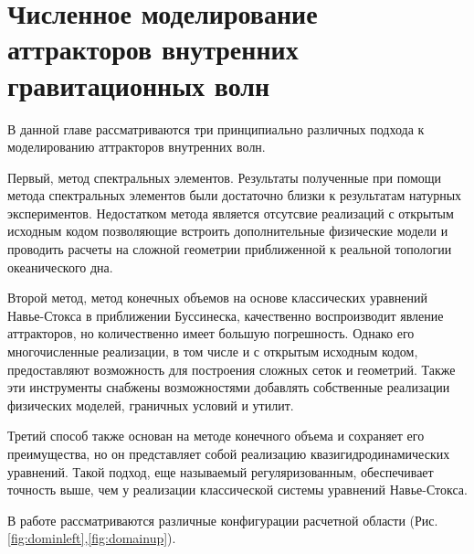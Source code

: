 \chapter{Численное моделирование аттракторов внутренних гравитационных волн}
\label{cha:Simulation}

В данной главе рассматриваются три принципиально различных подхода к моделированию аттракторов внутренних волн.

Первый, метод спектральных элементов\cite{Patera1984}. Результаты полученные при помощи метода спектральных элементов были достаточно близки к результатам натурных экспериментов\cite{Brouzet2016,Brouzet_2016}. Недостатком метода является отсутсвие реализаций с открытым исходным кодом позволяющие встроить дополнительные физические модели и проводить расчеты на сложной геометрии приближенной к реальной топологии океанического дна.

Второй метод, метод конечных объемов на основе классических уравнений Навье-Стокса в приближении Буссинеска, качественно воспроизводит явление аттракторов, но количественно имеет большую погрешность. Однако его многочисленные реализации, в том числе и с открытым исходным кодом, предоставляют возможность для построения сложных сеток и геометрий. Также эти инструменты снабжены возможностями добавлять собственные реализации физических моделей, граничных условий и утилит. 

Третий способ также основан на методе конечного объема и сохраняет его преимущества, но он представляет собой реализацию квазигидродинамических уравнений\cite{ElizarBook}. Такой подход, еще называемый регуляризованным, обеспечивает точность выше, чем у реализации классической системы уравнений Навье-Стокса.

В работе рассматриваются различные конфигурации расчетной области (Рис. \ref{fig:dominleft},\ref{fig:domainup}).

